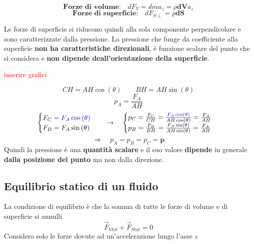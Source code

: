 \documentclass[x11names]{report}
\begin{document}
	\[ 
	\textbf{Forze di volume:} \quad dF_V = dma_z = \rho \boldsymbol{dV}a_z
	\]
	\[ 
	\textbf{Forze di superficie:} \quad dF_{S\perp} = p\boldsymbol{dS}
	\]
	
	\noindent
	Le forze di superficie si riducono quindi alla sola componente perpendicolare e sono caratterizzate dalla pressione. La pressione che funge da coefficiente alla superficie \textbf{non ha caratteristiche direzionali}, è funzione scalare del punto che si considera e \textbf{non dipende deall'orientazione della superficie}.
	
	\begin{center}
		\textcolor{red}{inserire grafici}
	\end{center}
	\[ 
	\boxed{CH = AH \cos\left(\theta\right)} \qquad \boxed{BH = AH \sin\left(\theta\right)}
	\]
	\[ 
	p_A = \frac{F_A}{AH}
	\]
	\[ 
	\begin{cases}
		F_C = \textcolor{blue}{F_A \cos\left(\theta\right)}\\
		F_B = F_A \sin\left(\theta\right)
	\end{cases} \quad \to \quad
	\begin{cases}
		p_C = \frac{F_C}{CH} = \frac{\textcolor{blue}{F_A \cos\left(\theta\right)}}{AH \cos\left(\theta\right)} = \frac{F_A}{AH} \\
		p_B = \frac{F_B}{BH} = \frac{F_A \sin\left(\theta\right)}{AH \sin\left(\theta\right)} = \frac{F_A}{AH}
	\end{cases}
	\]
	\[ 
	\Longrightarrow\quad p_A = p_B = p_C =\boldsymbol{p}
	\]
	Quindi la pressione è una \textbf{quantità scalare} e il suo valore \textbf{dipende} in generale \textbf{dalla posizione del punto} ma non dalla direzione.
	
	
	\subsection{Equilibrio statico di un fluido}
	La condizione di equilibrio è che la somma di tutte le forze di volume e di superficie si annulli
	\[ 
	\overrightarrow{F}_{Vtot} + \overrightarrow{F}_{Stot} = 0
	\]
	Considero solo le forze dovute ad un'accelerazione lungo l'asse \(z\)
	
\end{document}

